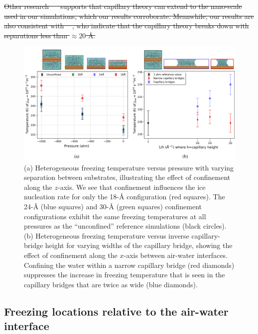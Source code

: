 \documentclass[journal abbreviation, manuscript]{copernicus}
\providecommand{\DIFdel}[1]{{\protect\color{red}\sout{#1}}}                      %
\providecommand{\DIFdelbegin}{} %
\providecommand{\DIFdelend}{} %
\begin{document}
\DIFdelbegin \DIFdel{Other research \mbox{%
\citep{elliott2021} }\hspace{0pt}%
supports that capillary theory can extend to the nano-scale used in our simulations, which our results corroborate. Meanwhile, our results are also consistent with \mbox{%
\citet{Almeida2021}}\hspace{0pt}%
, who indicate that the capillary theory breaks down with separations less than $\approx 20$ \AA{}.
}\DIFdelend 

\begin{figure}[t]
\includegraphics[width=12cm]{figures/confinement_effects.png}
\caption{(a) Heterogeneous freezing temperature versus pressure with varying separation between substrates, illustrating the effect of confinement along the $z$-axis. We see that confinement influences the ice nucleation rate for only the 18-\AA{} configuration (red squares). The 24-\AA{} (blue squares) and 30-\AA{} (green squares) confinement configurations exhibit the same freezing temperatures at all pressures as the ``unconfined'' reference simulations (black circles). (b) Heterogeneous freezing temperature versus inverse capillary-bridge height for varying widths of the capillary bridge, showing the effect of confinement along the $x$-axis between air-water interfaces. Confining the water within a narrow capillary bridge (red diamonds) suppresses the increase in freezing temperature that is seen in the capillary bridges that are twice as wide (blue diamonds).}
\label{fig:confinement}
\end{figure}



\subsection{Freezing locations relative to the air-water interface} \label{ice locations}
\end{document}
